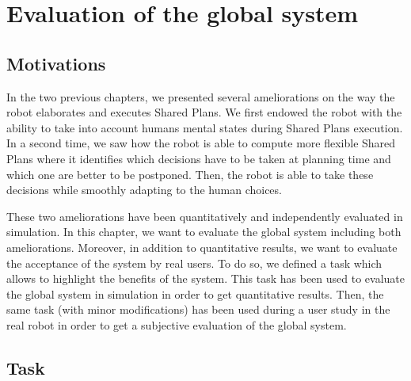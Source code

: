 \documentclass[english,a4paper,11pt,twoside]{StyleThese}
\begin{document}
\setcounter{chapter}{4} %
\dominitoc
\faketableofcontents
\fi

\chapter{Evaluation of the global system}
\minitoc

\label{ch:Eval}

\section{Motivations}

In the two previous chapters, we presented several ameliorations on the way the robot elaborates and executes Shared Plans. We first endowed the robot with the ability to take into account humans mental states during Shared Plans execution. In a second time, we saw how the robot is able to compute more flexible Shared Plans where it identifies which decisions have to be taken at planning time and which one are better to be postponed. Then, the robot is able to take these decisions while smoothly adapting to the human choices. 

These two ameliorations have been quantitatively and independently evaluated in simulation. In this chapter, we want to evaluate the global system including both ameliorations. Moreover, in addition to quantitative results, we want to evaluate the acceptance of the system by real users. To do so, we defined a task which allows to highlight the benefits of the system. This task has been used to evaluate the global system in simulation in order to get quantitative results. Then, the same task (with minor modifications) has been used during a user study in the real robot in order to get a subjective evaluation of the global system. 

\section{Task}

\label{sec:task_us}
\end{document}
